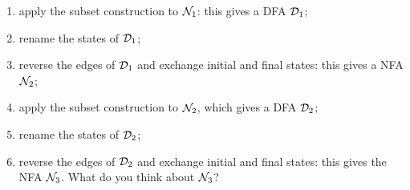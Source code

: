 
 \begin{enumerate}

    \item apply the subset construction to \({\cal N}_1\): this gives
      a DFA \({\cal D}_1\);

    \item rename the states of \({\cal D}_1\);

    \item reverse the edges of \({\cal D}_1\) and exchange initial and
      final states: this gives a NFA \({\cal N}_2\);

    \item apply the subset construction to \({\cal N}_2\), which gives
      a DFA \({\cal D}_2\);

    \item rename the states of \({\cal D}_2\);

    \item reverse the edges of \({\cal D}_2\) and exchange initial and
      final states: this gives the NFA \({\cal N}_3\). What do you
      think about \({\cal N}_3\)?
 
 \end{enumerate}

